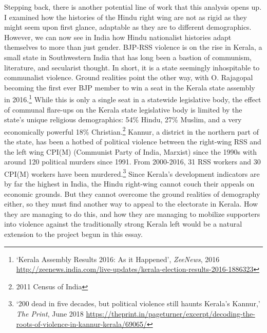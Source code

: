 \documentclass[a4paper, 12pt]{article}
\begin{document}
	Stepping back, there is another potential line of work that this analysis opens up. I examined how the histories of the Hindu right wing are not as rigid as they might seem upon first glance, adaptable as they are to different demographics. However, we can now see in India how Hindu nationalist histories adapt themselves to more than just gender. BJP-RSS violence is on the rise in Kerala, a small state in Southwestern India that has long been a bastion of communism, literature, and secularist thought. In short, it is a state seemingly inhospitable to communalist violence. Ground realities point the other way, with O. Rajagopal becoming the first ever BJP member to win a seat in the Kerala state assembly in 2016.\footnote{`Kerala Assembly Results 2016: As it Happened', \textit{ZeeNews}, 2016 \url{http://zeenews.india.com/live-updates/kerala-election-results-2016-1886323}} While this is only a single seat in a statewide legislative body, the effect of communal flare-ups on the Kerala state legislative body is limited by the state's unique religious demographics: 54\% Hindu, 27\% Muslim, and a very economically powerful 18\% Christian.\footnote{2011 Census of India} Kannur, a district in the northern part of the state, has been a hotbed of political violence between the right-wing RSS and the left wing CPI(M) (Communist Party of India, Marxist) since the 1990s with around 120 political murders since 1991. From 2000-2016, 31 RSS workers and 30 CPI(M) workers have been murdered.\footnote{`200 dead in five decades, but political violence still haunts Kerala's Kannur,' \textit{The Print}, June 2018 \url{https://theprint.in/pageturner/excerpt/decoding-the-roots-of-violence-in-kannur-kerala/69065/}} Since Kerala's development indicators are by far the highest in India, the Hindu right-wing cannot couch their appeals on economic grounds. But they cannot overcome the ground realities of demography either, so they must find another way to appeal to the electorate in Kerala. How they are managing to do this, and how they are managing to mobilize supporters into violence against the traditionally strong Kerala left would be a natural extension to the project begun in this essay. 
\end{document}

